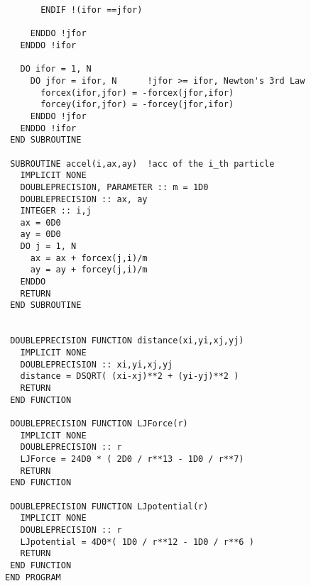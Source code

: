\documentclass{article}
\begin{document}
\begin{verbatim}
	   ENDIF !(ifor ==jfor)
	   
     ENDDO !jfor
   ENDDO !ifor  

   DO ifor = 1, N
     DO jfor = ifor, N      !jfor >= ifor, Newton's 3rd Law
       forcex(ifor,jfor) = -forcex(jfor,ifor)
	   forcey(ifor,jfor) = -forcey(jfor,ifor)
     ENDDO !jfor
   ENDDO !ifor 
 END SUBROUTINE

 SUBROUTINE accel(i,ax,ay)  !acc of the i_th particle
   IMPLICIT NONE
   DOUBLEPRECISION, PARAMETER :: m = 1D0
   DOUBLEPRECISION :: ax, ay
   INTEGER :: i,j
   ax = 0D0
   ay = 0D0
   DO j = 1, N
     ax = ax + forcex(j,i)/m
	 ay = ay + forcey(j,i)/m
   ENDDO
   RETURN
 END SUBROUTINE

   
 DOUBLEPRECISION FUNCTION distance(xi,yi,xj,yj)
   IMPLICIT NONE
   DOUBLEPRECISION :: xi,yi,xj,yj
   distance = DSQRT( (xi-xj)**2 + (yi-yj)**2 )
   RETURN
 END FUNCTION

 DOUBLEPRECISION FUNCTION LJForce(r)
   IMPLICIT NONE
   DOUBLEPRECISION :: r
   LJForce = 24D0 * ( 2D0 / r**13 - 1D0 / r**7)
   RETURN
 END FUNCTION

 DOUBLEPRECISION FUNCTION LJpotential(r)
   IMPLICIT NONE
   DOUBLEPRECISION :: r
   LJpotential = 4D0*( 1D0 / r**12 - 1D0 / r**6 )
   RETURN
 END FUNCTION
END PROGRAM
\end{verbatim}
\end{document}
